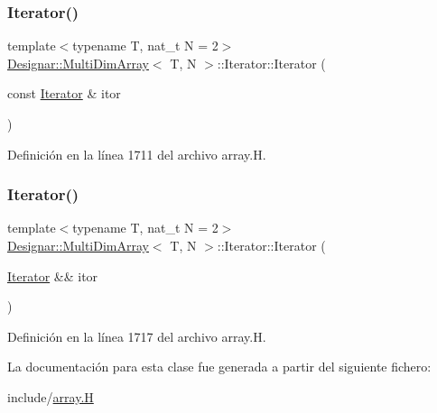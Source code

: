 \mbox{\label{class_designar_1_1_multi_dim_array_1_1_iterator_a2d0c217ae08b2203c50e1d1a01c3af40}} 
\subsubsection{\texorpdfstring{Iterator()}{Iterator()}\hspace{0.1cm}{\footnotesize\ttfamily [4/5]}}
{\footnotesize\ttfamily template$<$typename T, nat\+\_\+t N = 2$>$ \\
\hyperlink{class_designar_1_1_multi_dim_array}{Designar\+::\+Multi\+Dim\+Array}$<$ T, N $>$\+::Iterator\+::\+Iterator (\begin{DoxyParamCaption}\item[{const \hyperlink{class_designar_1_1_multi_dim_array_1_1_iterator}{Iterator} \&}]{itor }\end{DoxyParamCaption})\hspace{0.3cm}{\ttfamily [inline]}}



Definición en la línea 1711 del archivo array.\+H.

\mbox{\label{class_designar_1_1_multi_dim_array_1_1_iterator_af6ebf97caae786b50dcb6062b3ab7b0b}} 
\subsubsection{\texorpdfstring{Iterator()}{Iterator()}\hspace{0.1cm}{\footnotesize\ttfamily [5/5]}}
{\footnotesize\ttfamily template$<$typename T, nat\+\_\+t N = 2$>$ \\
\hyperlink{class_designar_1_1_multi_dim_array}{Designar\+::\+Multi\+Dim\+Array}$<$ T, N $>$\+::Iterator\+::\+Iterator (\begin{DoxyParamCaption}\item[{\hyperlink{class_designar_1_1_multi_dim_array_1_1_iterator}{Iterator} \&\&}]{itor }\end{DoxyParamCaption})\hspace{0.3cm}{\ttfamily [inline]}}



Definición en la línea 1717 del archivo array.\+H.



La documentación para esta clase fue generada a partir del siguiente fichero\+:\begin{DoxyCompactItemize}
\item 
include/\hyperlink{array_8_h}{array.\+H}\end{DoxyCompactItemize}
